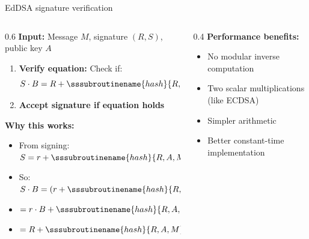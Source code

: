 \documentclass[aspectratio=169, lualatex, handout]{beamer}
\begin{document}
\begin{frame}{EdDSA signature verification}
	\begin{columns}
		\begin{column}{0.6\textwidth}
			\textbf{Input:} Message $M$, signature $(R, S)$, public key $A$
			\begin{enumerate}[<+->]
				\item \textbf{Verify equation:} Check if:
				      $$S \cdot B = R + \sssubroutinename{hash}{R, A, M} \cdot A$$
				\item \textbf{Accept signature if equation holds}
			\end{enumerate}
			\vspace{0.5cm}
			\textbf{Why this works:}
			\begin{itemize}[<+->]
				\item From signing: $S = r + \sssubroutinename{hash}{R, A, M} \times a$
				\item So: $S \cdot B = (r + \sssubroutinename{hash}{R, A, M} \times a) \cdot B$
				\item $= r \cdot B + \sssubroutinename{hash}{R, A, M} \times a \cdot B$
				\item $= R + \sssubroutinename{hash}{R, A, M} \times A$
			\end{itemize}
		\end{column}
		\begin{column}{0.4\textwidth}
			\textbf{Performance benefits:}
			\begin{itemize}[<+->]
				\item No modular inverse computation
				\item Two scalar multiplications (like ECDSA)
				\item Simpler arithmetic
				\item Better constant-time implementation
			\end{itemize}
		\end{column}
	\end{columns}
\end{frame}
\end{document}
